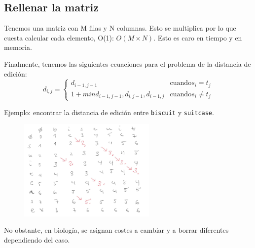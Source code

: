 \subsection{Rellenar la matriz}
Tenemos una matriz con M filas y N columnas. Esto se multiplica por lo que cuesta calcular cada elemento, O(1): $O(M \times N)$. Esto es caro en tiempo y en memoria. 

Finalmente, tenemos las siguientes ecuaciones para el problema de la distancia de edición:
$$d_{i,j} = \begin{cases}
d_{i-1, j-1} & \text{cuando} s_i = t_j \\
1 + min {d_{i-1, j-1}, d_{i, j-1}, d_{i-1, j}} & \text{cuando} s_i \neq t_j
\end{cases} $$

Ejemplo: encontrar la distancia de edición entre \texttt{biscuit} y \texttt{suitcase}.
\begin{figure}[h]
\centering
\includegraphics[width = 0.6\textwidth]{figs/edit-distance-ex.png}
\end{figure}

No obstante, en biología, se asignan costes a cambiar y a borrar diferentes dependiendo del caso.
